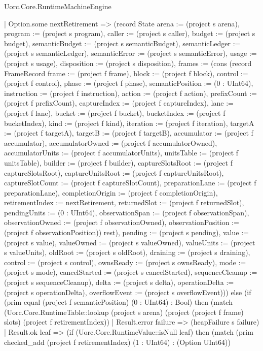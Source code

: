 \begin{lexlean}{Uorc.Core.RuntimeMachineEngine}
\begin{semanticmodule}
{        | Option.some nextRetirement => (record State {arena := (project s arena), program := (project s program), caller := (project s caller), budget := (project s budget), semanticBudget := (project s semanticBudget), semanticLedger := (project s semanticLedger), semanticError := (project s semanticError), usage := (project s usage), disposition := (project s disposition), frames := (cons (record FrameRecord {frame := (project f frame), block := (project f block), control := (project f control), phase := (project f phase), semanticPosition := (0 : UInt64), instruction := (project f instruction), action := (project f action), prefixCount := (project f prefixCount), captureIndex := (project f captureIndex), lane := (project f lane), bucket := (project f bucket), bucketIndex := (project f bucketIndex), kind := (project f kind), iteration := (project f iteration), targetA := (project f targetA), targetB := (project f targetB), accumulator := (project f accumulator), accumulatorOwned := (project f accumulatorOwned), accumulatorUnits := (project f accumulatorUnits), unitsTable := (project f unitsTable), builder := (project f builder), captureSlotsRoot := (project f captureSlotsRoot), captureUnitsRoot := (project f captureUnitsRoot), captureSlotCount := (project f captureSlotCount), preparationLane := (project f preparationLane), completionOrigin := (project f completionOrigin), retirementIndex := nextRetirement, returnedSlot := (project f returnedSlot), pendingUnits := (0 : UInt64), observationSpan := (project f observationSpan), observationOwned := (project f observationOwned), observationPosition := (project f observationPosition)}) rest), pending := (project s pending), value := (project s value), valueOwned := (project s valueOwned), valueUnits := (project s valueUnits), oldRoot := (project s oldRoot), draining := (project s draining), control := (project s control), ownsReady := (project s ownsReady), mode := (project s mode), cancelStarted := (project s cancelStarted), sequenceCleanup := (project s sequenceCleanup), delta := (project s delta), operationDelta := (project s operationDelta), overflowEvent := (project s overflowEvent)})) else (if (prim equal (project f semanticPosition) (0 : UInt64) : Bool) then (match (Uorc.Core.RuntimeTable::lookup (project s arena) (project (project f frame) slots) (project f retirementIndex))
        | Result.error failure => (heapFailure s failure)
        | Result.ok leaf => (if (Uorc.Core.RuntimeValue::isNull leaf) then (match (prim checked_add (project f retirementIndex) (1 : UInt64) : (Option UInt64))
}
\end{semanticmodule}
\end{lexlean}
